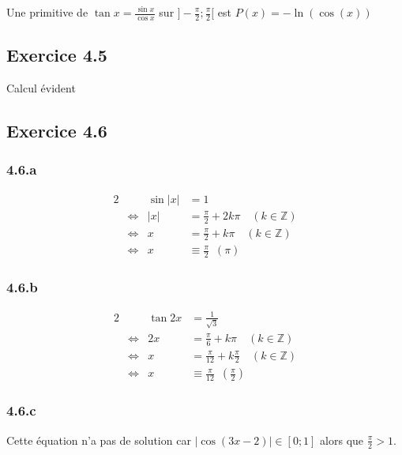 \documentclass[a4paper,10pt]{report}
\begin{document}
Une primitive de $\tan x = \frac{\sin x}{\cos x}$ sur $]-\frac{\pi}{2} ; \frac{\pi}{2}[$ est $P(x)=-\ln(\cos(x))$

\subsection*{Exercice 4.5}

Calcul évident

\subsection*{Exercice 4.6}

\subsubsection*{4.6.a}
\begin{alignat*}{2}
	&                    & \sin |x| &= 1 \\
	&\Longleftrightarrow & |x| &= \frac{\pi}{2} + 2k\pi \quad (k \in \mathbb{Z}) \\
	&\Longleftrightarrow &   x &= \frac{\pi}{2} + k\pi \quad (k \in \mathbb{Z}) \\
	&\Longleftrightarrow &   x &\equiv \frac{\pi}{2} \enspace (\pi)
\end{alignat*}

\subsubsection*{4.6.b}
\begin{alignat*}{2}
	&                    & \tan 2x &= \frac{1}{\sqrt{3}} \\
	&\Longleftrightarrow & 2x      &= \frac{\pi}{6} + k\pi \quad (k \in \mathbb{Z}) \\
	&\Longleftrightarrow & x       &= \frac{\pi}{12} + k\frac{\pi}{2} \quad (k \in \mathbb{Z}) \\
	&\Longleftrightarrow &       x &\equiv \frac{\pi}{12} \enspace \left(\frac{\pi}{2}\right)
\end{alignat*}


\subsubsection*{4.6.c}

Cette équation n'a pas de solution car $|\cos(3x-2)| \in [0 ; 1]$ alors que $\frac{\pi}{2} > 1$.
\end{document}
